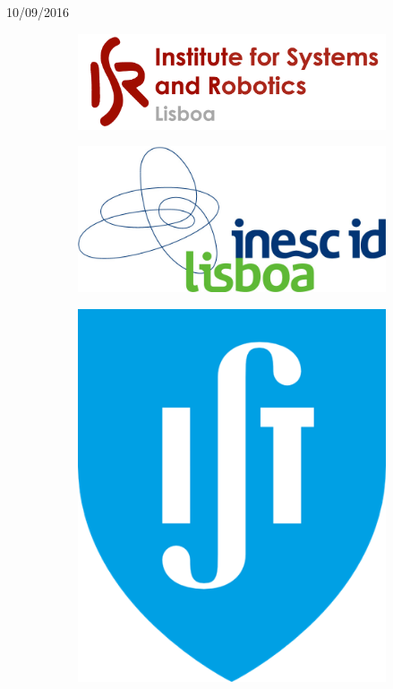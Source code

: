 \begin{titlepage}


{\large 10/09/2016}\\[1cm] %




\begin{figure}
\centering
\begin{subfigure}{.5\textwidth}
  \centering
  \includegraphics[width=.5\linewidth]{isr-logo.png}
\end{subfigure}%
\begin{subfigure}{.5\textwidth}
  \centering
  \includegraphics[width=.5\linewidth]{inesc-id-logo.png}
\end{subfigure}
\begin{subfigure}{.5\textwidth}
  \centering
  \includegraphics[width=.25\linewidth]{ist-logo.png}
\end{subfigure}
\end{figure}
 

\vfill %

\end{titlepage}

